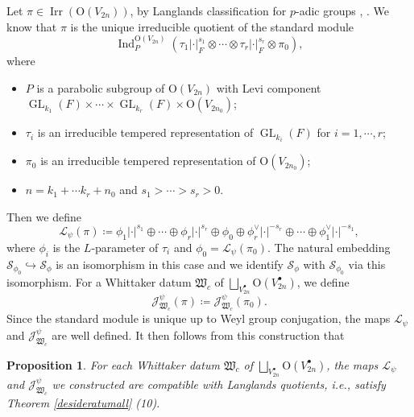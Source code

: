\documentclass[article]{article}
\numberwithin{equation}{section}
\newtheorem{proposition}[theorem]{Proposition}
\theoremstyle{definition}
\DeclareMathOperator{\Ind}{Ind}
\DeclareMathOperator{\GL}{GL}
\DeclareMathOperator{\Irr}{Irr}
\begin{document}
Let $\pi\in \Irr(\mathrm O(V_{2n}))$, by Langlands classification for $p$-adic groups \cite{MR507262}, \cite{MR2050093}. We know that $\pi$ is the unique irreducible quotient of the standard module 
\begin{equation*}
\Ind_{P}^{\mathrm O(V_{2n})}\left(\tau_{1}|\cdot|_F^{s_1}\otimes \cdots\otimes \tau_{r}|\cdot|_F^{s_r}\otimes\pi_{0} \right),
\end{equation*}
where 
\begin{itemize}
	\item $P$ is a parabolic subgroup of $\mathrm O(V_{2n})$ with Levi component $\GL_{k_{1}}(F)\times \cdots \times \GL_{k_{r}}(F)\times \mathrm O(V_{2n_0})$;
	\item $\tau_{i}$ is an irreducible tempered representation of $\GL_{k_{i}}(F)$ for $i=1,\cdots,r$;
	\item $\pi_0$ is an irreducible tempered representation of $\mathrm O(V_{2n_0})$;
	\item $n=k_1+\cdots k_r +n_0 $ and $s_1>\cdots >s_r>0$. 
\end{itemize}
Then we define
$$
\mathcal L_{\psi}(\pi)\coloneqq \phi_{1}|\cdot|^{s_1}\oplus\cdots \oplus \phi_{r}|\cdot|^{s_r}\oplus \phi_0\oplus \phi_{r}^{\vee}|\cdot|^{-s_r}\oplus \cdots \oplus  \phi_{1}^{\vee}|\cdot|^{-s_1},
$$
where $\phi_{i}$ is the $L$-parameter of $\tau_{i}$ and $\phi_0=\mathcal L_{\psi}(\pi_0)$. The natural embedding $\mathcal S_{\phi_0}\hookrightarrow \mathcal {S}_{\phi}$ is an isomorphism in this case and we identify $\mathcal {S}_{\phi}$ with $\mathcal S_{\phi_{0}}$ via this isomorphism. For a Whittaker datum $\mathfrak W_{c}$ of $\bigsqcup_{V_{2n}^\bullet}\mathrm O(V_{2n}^\bullet)$, we define  
$$
\mathcal J^\psi_{\mathfrak W_{c}}(\pi)\coloneqq \mathcal J^\psi_{\mathfrak W_{c}}(\pi_0).
$$
Since the standard module is unique up to Weyl group conjugation, the maps $\mathcal L_{\psi}$ and $\mathcal J_{\mathfrak W_c}^\psi$ are well defined. It then follows from this construction that 
\begin{proposition}\label{Langlandsclasification}
For each Whittaker datum $\mathfrak W_{c}$ of $\bigsqcup_{V_{2n}^\bullet}\mathrm O(V_{2n}^\bullet)$, the maps $\mathcal L_{\psi}$ and $\mathcal J^\psi_{\mathfrak W_{c}}$ we constructed are compatible with Langlands quotients, i.e., satisfy Theorem \ref{desideratumall} (10). 
\end{proposition}
\end{document}
